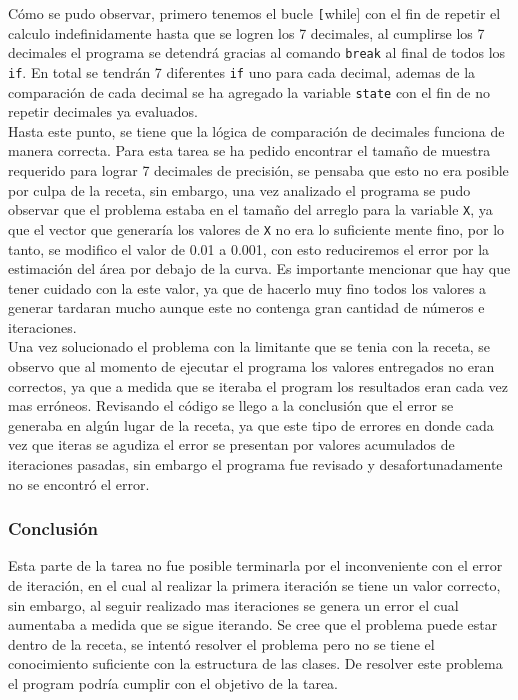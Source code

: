 \documentclass{article}
\begin{document}
 Cómo se pudo observar, primero tenemos el bucle \texttt[while] con el fin de repetir el calculo indefinidamente hasta que se logren los 7 decimales, al cumplirse los 7 decimales el programa se detendrá gracias al comando \texttt{break} al final de todos los \texttt{if}. En total se tendrán 7 diferentes \texttt{if} uno para cada decimal, ademas de la comparación de cada decimal se ha agregado la variable \texttt{state} con el fin de no repetir decimales ya evaluados.\\
 
Hasta este punto, se tiene que la lógica de comparación de decimales funciona de manera correcta. Para esta tarea se ha pedido encontrar el tamaño de muestra requerido para lograr 7 decimales de precisión, se pensaba que esto no era posible por culpa de la receta, sin embargo, una vez analizado el programa se pudo observar que el problema estaba en el tamaño del arreglo para la variable \texttt{X}, ya que el vector que generaría los valores de \texttt{X} no era lo suficiente mente fino, por lo tanto, se modifico el valor de 0.01 a 0.001, con esto reduciremos el error por la estimación del área por debajo de la curva. Es importante mencionar que hay que tener cuidado con la este valor, ya que de hacerlo muy fino todos los valores a generar tardaran mucho aunque este no contenga gran cantidad de números e iteraciones. \\

Una vez solucionado el problema con la limitante que se tenia con la receta, se observo que al momento de ejecutar el programa los valores entregados no eran correctos, ya que a medida que se iteraba el program los resultados eran cada vez mas erróneos. Revisando el código se llego a la conclusión que el error se generaba en algún lugar de la receta, ya que este tipo de errores en donde cada vez que iteras se agudiza el error se presentan por valores acumulados de iteraciones pasadas, sin embargo el programa fue revisado y desafortunadamente no se  encontró el error. 
  
  \subsubsection{Conclusión}
Esta parte de la tarea no fue posible terminarla por el inconveniente con el error de iteración, en el cual al realizar la primera iteración se tiene un valor correcto, sin embargo, al seguir realizado mas iteraciones se genera  un error el cual aumentaba a medida que se sigue iterando. Se cree que el problema puede estar dentro de la receta, se intentó resolver el problema pero no se tiene el conocimiento suficiente con la estructura de las clases. De resolver este problema el program podría cumplir con el objetivo de la tarea.
\end{document}
